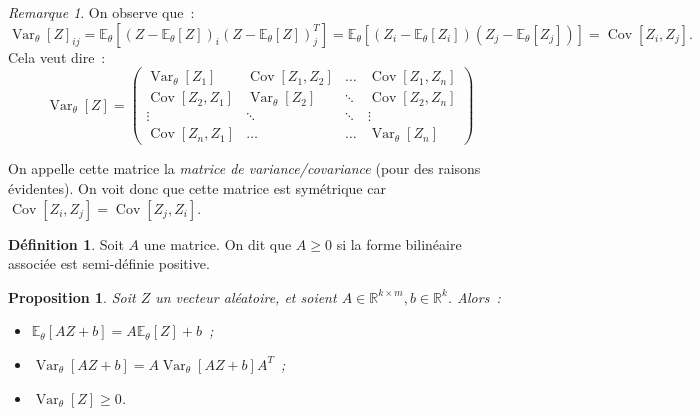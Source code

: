 \documentclass{report}
\DeclareMathOperator{\Var}{Var}
\DeclareMathOperator{\Cov}{Cov}
\newcommand{\E}{\mathbb E}
\newcommand{\R}{\mathbb R}
\newtheorem{prp}[thm]{Proposition}
\theoremstyle{definition}
\newtheorem{déf}[thm]{Définition}
\theoremstyle{remark}
\newtheorem*{rmq}{Remarque}
\begin{document}
			\begin{rmq} On observe que~:
			\[\Var_\theta[Z]_{ij} = \E_\theta\left[(Z - \E_\theta[Z])_i(Z - \E_\theta[Z])_j^T\right] = \E_\theta\left[(Z_i - \E_\theta[Z_i])(Z_j - \E_\theta[Z_j])\right]
				= \Cov[Z_i, Z_j].\]
			Cela veut dire~:
			\[\Var_\theta[Z] =
				\begin{pmatrix}
					\Var_\theta[Z_1]      & \Cov[Z_1, Z_2] & \ldots & \Cov[Z_1, Z_n] \\
					\Cov[Z_2, Z_1] & \Var_\theta[Z_2]      & \ddots & \Cov[Z_2, Z_n] \\
					\vdots         & \ddots         & \ddots & \vdots         \\
					\Cov[Z_n, Z_1] & \ldots         & \ldots & \Var_\theta[Z_n]
				\end{pmatrix}
			\]

			On appelle cette matrice la \textit{matrice de variance/covariance} (pour des raisons évidentes). On voit donc que cette matrice est symétrique car
			$\Cov[Z_i, Z_j] = \Cov[Z_j, Z_i]$.
			\end{rmq}

			\begin{déf} Soit $A$ une matrice. On dit que $A \geq 0$ si la forme bilinéaire associée est semi-définie positive.
			\end{déf}

			\begin{prp} Soit $Z$ un vecteur aléatoire, et soient $A \in \R^{k \times m}, b \in \R^k$. Alors~:
			\begin{itemize}
				\item $\E_\theta[AZ + b] = A\E_\theta[Z] + b$~;
				\item $\Var_\theta[AZ + b] = A\Var_\theta[AZ + b]A^T$~;
				\item $\Var_\theta[Z] \geq 0$.
			\end{itemize}
			\end{prp}
\end{document}
